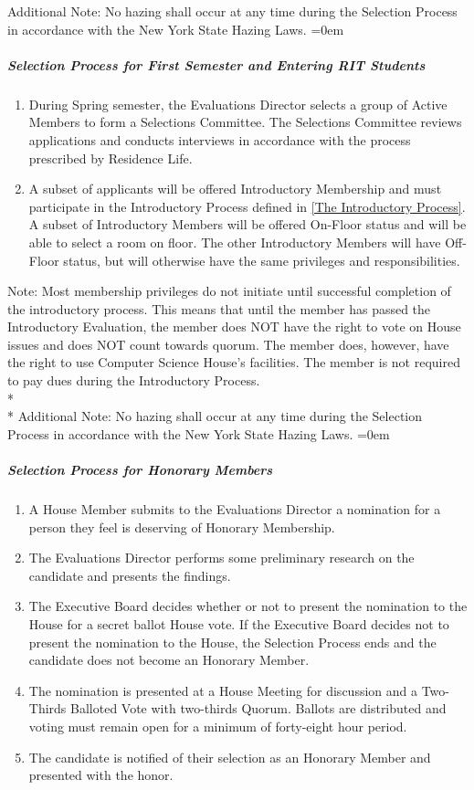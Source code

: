 \documentclass{article}
\newcommand{\asubsubsubsection}[1]{\parindent=0em\subparagraph{#1} \label{#1}}
\begin{document}
Additional Note: No hazing shall occur at any time during the Selection Process in accordance with the New York State Hazing Laws.
\asubsubsubsection{Selection Process for First Semester and Entering RIT Students}
\begin{enumerate}
	\item During Spring semester, the Evaluations Director selects a group of Active Members to form a Selections Committee.
		The Selections Committee reviews applications and conducts interviews in accordance with the process prescribed by Residence Life.
        \item A subset of applicants will be offered Introductory Membership and must participate in the Introductory Process defined in \ref{The Introductory Process}. 
            A subset of Introductory Members will be offered On-Floor status and will be able to select a room on floor. 
            The other Introductory Members will have Off-Floor status, but will otherwise have the same privileges and responsibilities.
\end{enumerate}
Note: Most membership privileges do not initiate until successful completion of the introductory process.
This means that until the member has passed the Introductory Evaluation, the member does NOT have the right to vote on House issues and does NOT count towards quorum.
The member does, however, have the right to use Computer Science House's facilities.
The member is not required to pay dues during the Introductory Process.
\\* \\*
Additional Note: No hazing shall occur at any time during the Selection Process in accordance with the New York State Hazing Laws.
\asubsubsubsection{Selection Process for Honorary Members}
\begin{enumerate}
	\item A House Member submits to the Evaluations Director a nomination for a person they feel is deserving of Honorary Membership.
	\item The Evaluations Director performs some preliminary research on the candidate and presents the findings.
	\item The Executive Board decides whether or not to present the nomination to the House for a secret ballot House vote.
		If the Executive Board decides not to present the nomination to the House, the Selection Process ends and the candidate does not become an Honorary Member.
	\item The nomination is presented at a House Meeting for discussion and a Two-Thirds Balloted Vote with two-thirds Quorum.
		Ballots are distributed and voting must remain open for a minimum of forty-eight hour period.
	\item The candidate is notified of their selection as an Honorary Member and presented with the honor.
\end{enumerate}
\end{document}
